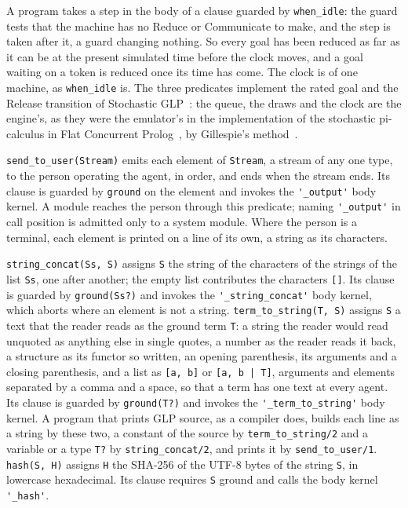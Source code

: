A program takes a step in the body of a clause guarded by \verb|when_idle|: the guard tests that the machine has no Reduce or Communicate to make, and the step is taken after it, a guard changing nothing. So every goal has been reduced as far as it can be at the present simulated time before the clock moves, and a goal waiting on a token is reduced once its time has come. The clock is of one machine, as \verb|when_idle| is. The three predicates implement the rated goal and the Release transition of Stochastic GLP~\cite{shapiro2026sglp}: the queue, the draws and the clock are the engine's, as they were the emulator's in the implementation of the stochastic pi-calculus in Flat Concurrent Prolog~\cite{priami2001application}, by Gillespie's method~\cite{gillespie1977exact}.

\verb|send_to_user(Stream)| emits each element of \verb|Stream|, a stream of any one type, to the person operating the agent, in order, and ends when the stream ends. Its clause is guarded by \verb|ground| on the element and invokes the \verb|'_output'| body kernel. A module reaches the person through this predicate; naming \verb|'_output'| in call position is admitted only to a system module. Where the person is a terminal, each element is printed on a line of its own, a string as its characters.

\verb|string_concat(Ss, S)| assigns \verb|S| the string of the characters of the strings of the list \verb|Ss|, one after another; the empty list contributes the characters \verb|[]|. Its clause is guarded by \verb|ground(Ss?)| and invokes the \verb|'_string_concat'| body kernel, which aborts where an element is not a string. \verb|term_to_string(T, S)| assigns \verb|S| a text that the reader reads as the ground term \verb|T|: a string the reader would read unquoted as anything else in single quotes, a number as the reader reads it back, a structure as its functor so written, an opening parenthesis, its arguments and a closing parenthesis, and a list as \verb|[a, b]| or \verb~[a, b | T]~, arguments and elements separated by a comma and a space, so that a term has one text at every agent. Its clause is guarded by \verb|ground(T?)| and invokes the \verb|'_term_to_string'| body kernel. A program that prints GLP source, as a compiler does, builds each line as a string by these two, a constant of the source by \verb|term_to_string/2| and a variable or a type \verb|T?| by \verb|string_concat/2|, and prints it by \verb|send_to_user/1|. \verb|hash(S, H)| assigns \verb|H| the SHA-256 of the UTF-8 bytes of the string \verb|S|, in lowercase hexadecimal. Its clause requires \verb|S| ground and calls the body kernel \verb|'_hash'|.

